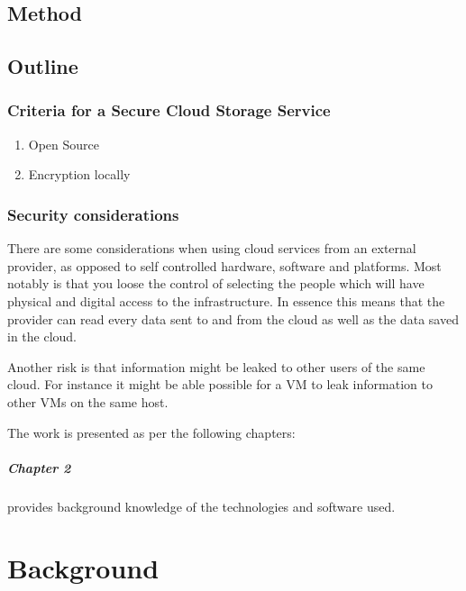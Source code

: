 \documentclass[pdftex,english,10pt,b5paper,twoside]{book}
\begin{document}
\section{Method}

\section{Outline}

\subsection{Criteria for a Secure Cloud Storage Service}
\label{sec:criteria}
\begin{enumerate}
  \item Open Source
  \item Encryption locally
\end{enumerate}

\subsection{Security considerations}

There are some considerations when using
cloud services from an external provider, as opposed to self controlled
hardware, software and platforms. Most notably is that you loose the control of
selecting the people which will have physical and digital access to the
infrastructure. In essence this means that the provider can read every data
sent to and from the cloud as well as the data saved in the cloud.

Another risk is that information might be leaked to other users of the same
cloud. For instance it might be able possible for a \ac{VM} to leak information
to other \ac{VM}s on the same host.


The work is presented as per the following chapters:

\paragraph{Chapter 2} provides background knowledge of the technologies and
software used.


\chapter{Background}
\end{document}
